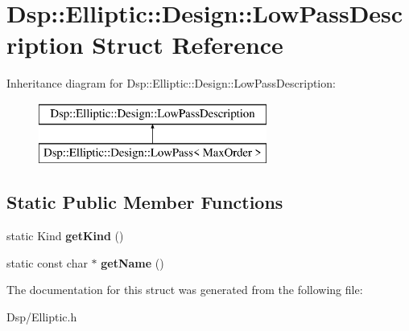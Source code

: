 \hypertarget{structDsp_1_1Elliptic_1_1Design_1_1LowPassDescription}{\section{Dsp\-:\-:Elliptic\-:\-:Design\-:\-:Low\-Pass\-Description Struct Reference}
\label{structDsp_1_1Elliptic_1_1Design_1_1LowPassDescription}
}
Inheritance diagram for Dsp\-:\-:Elliptic\-:\-:Design\-:\-:Low\-Pass\-Description\-:\begin{figure}[H]
\begin{center}
\leavevmode
\includegraphics[height=2.000000cm]{structDsp_1_1Elliptic_1_1Design_1_1LowPassDescription}
\end{center}
\end{figure}
\subsection*{Static Public Member Functions}
\begin{DoxyCompactItemize}
\item 
\hypertarget{structDsp_1_1Elliptic_1_1Design_1_1LowPassDescription_ae56d86e25f57289f3136712e4212812c}{static Kind {\bfseries get\-Kind} ()}\label{structDsp_1_1Elliptic_1_1Design_1_1LowPassDescription_ae56d86e25f57289f3136712e4212812c}

\item 
\hypertarget{structDsp_1_1Elliptic_1_1Design_1_1LowPassDescription_a47950a0dcba8825f7a0b4d5cfd25fd9e}{static const char $\ast$ {\bfseries get\-Name} ()}\label{structDsp_1_1Elliptic_1_1Design_1_1LowPassDescription_a47950a0dcba8825f7a0b4d5cfd25fd9e}

\end{DoxyCompactItemize}


The documentation for this struct was generated from the following file\-:\begin{DoxyCompactItemize}
\item 
Dsp/Elliptic.\-h\end{DoxyCompactItemize}
